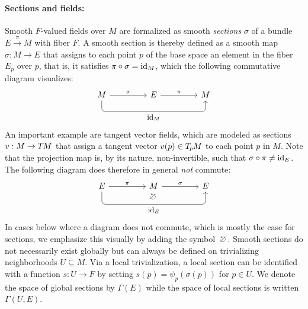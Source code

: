 \paragraph{Sections and fields:}
Smooth $F$-valued fields over $M$ are formalized as smooth \emph{sections} $\sigma$ of a bundle $E\!\xrightarrow{\pi}\!M$ with fiber $F$.
A smooth section is thereby defined as a smooth map $\sigma:M\to E$ that assigns to each point $p$ of the base space an element in the fiber $E_p$ over $p$, that is, it satisfies $\pi\circ\sigma=\mathrm{id}_M$, which the following commutative diagram visualizes:
\begin{equation}\label{cd:section_proj_idM}
\begin{tikzcd}[row sep=3em, column sep=4.5em]
      M \arrow[r, "\sigma"]
        \arrow[rr, rounded corners, to path={ 
                  -- ([yshift=-3.ex]\tikztostart.south) 
                  --node[below, pos=.5]{\small$\id_M$} ([yshift=-3.ex]\tikztotarget.south) 
                  -- (\tikztotarget.south)
                  }]
    & E \arrow[r, "\pi"]
    & M
\end{tikzcd}
\end{equation}
An important example are tangent vector fields, which are modeled as sections $v: M\to T\mkern-1.5muM$ that assign a tangent vector $v(p)\in T_{\mkern-1.5mu p}\mkern-.5muM$ to each point $p$ in $M$.
Note that the projection map is, by its nature, non-invertible, such that $\sigma\circ\pi\neq\mathrm{id}_E$.
The following diagram does therefore in general \emph{not} commute:
\begin{equation}\label{cd:section_proj_noncommutative}
\begin{tikzcd}[row sep=3em, column sep=4.5em,
               execute at end picture={
                    \node [] at (-.04, -.46) {$\noncommutative$};
                    }]
      E \arrow[r, "\pi"]
        \arrow[rr, rounded corners, to path={ 
                  -- ([yshift=-3.5ex]\tikztostart.south) 
                  --node[below, pos=.5]{\small$\id_E$} ([yshift=-3.5ex]\tikztotarget.south) 
                  -- (\tikztotarget.south)
                  }]
    & M \arrow[r, "\sigma"]
    & E
\end{tikzcd}
\end{equation}
In cases below where a diagram does not commute, which is mostly the case for sections, we emphasize this visually by adding the symbol $\raisebox{-2pt}{\noncommutative}$.
Smooth sections do not necessarily exist globally but can always be defined on trivializing neighborhoods $U\subseteq M$.
Via a local trivialization, a local section can be identified with a function $s:U\to F$ by setting $s(p) = \psi_p(\sigma(p))$ for $p\in U$.
We denote the space of global sections by $\Gamma(E)$ while the space of local sections is written $\Gamma(U,E)$.








